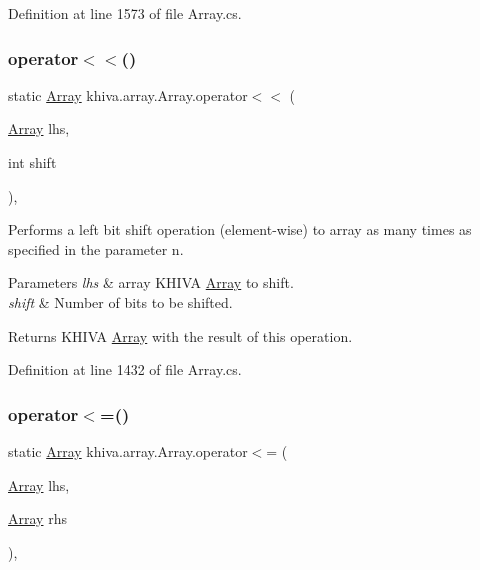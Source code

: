 Definition at line 1573 of file Array.\+cs.

\mbox{\label{classkhiva_1_1array_1_1_array_a13cb635c3e15fc0751e94009ad4f2570}} 
\subsubsection{\texorpdfstring{operator$<$$<$()}{operator<<()}}
{\footnotesize\ttfamily static \mbox{\hyperlink{classkhiva_1_1array_1_1_array}{Array}} khiva.\+array.\+Array.\+operator$<$$<$ (\begin{DoxyParamCaption}\item[{\mbox{\hyperlink{classkhiva_1_1array_1_1_array}{Array}}}]{lhs,  }\item[{int}]{shift }\end{DoxyParamCaption})\hspace{0.3cm}{\ttfamily [inline]}, {\ttfamily [static]}}



Performs a left bit shift operation (element-\/wise) to array as many times as specified in the parameter n. 


\begin{DoxyParams}{Parameters}
{\em lhs} & array K\+H\+I\+VA \mbox{\hyperlink{classkhiva_1_1array_1_1_array}{Array}} to shift.\\
\hline
{\em shift} & Number of bits to be shifted.\\
\hline
\end{DoxyParams}
\begin{DoxyReturn}{Returns}
K\+H\+I\+VA \mbox{\hyperlink{classkhiva_1_1array_1_1_array}{Array}} with the result of this operation.
\end{DoxyReturn}


Definition at line 1432 of file Array.\+cs.

\mbox{\label{classkhiva_1_1array_1_1_array_ac038773f7b9393447aca3232671f6c1a}} 
\subsubsection{\texorpdfstring{operator$<$=()}{operator<=()}}
{\footnotesize\ttfamily static \mbox{\hyperlink{classkhiva_1_1array_1_1_array}{Array}} khiva.\+array.\+Array.\+operator$<$= (\begin{DoxyParamCaption}\item[{\mbox{\hyperlink{classkhiva_1_1array_1_1_array}{Array}}}]{lhs,  }\item[{\mbox{\hyperlink{classkhiva_1_1array_1_1_array}{Array}}}]{rhs }\end{DoxyParamCaption})\hspace{0.3cm}{\ttfamily [inline]}, {\ttfamily [static]}}



